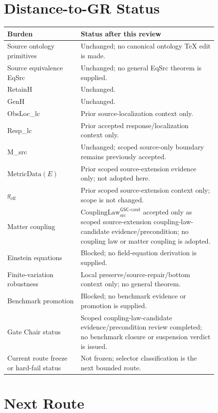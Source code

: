 \documentclass[11pt]{article}
\newcommand{\geff}{g_{\mathrm{eff}}}
\newcommand{\CouplingLaw}{\mathrm{CouplingLaw}^{\mathsf{GSC}\mbox{-}\mathrm{cand}}_{\mathrm{src}}}
\newcommand{\MetricData}{\mathrm{MetricData}}
\begin{document}
\section{Distance-to-GR Status}

\begin{longtable}{p{0.30\linewidth}p{0.56\linewidth}}
\toprule
Burden & Status after this review \\
\midrule
Source ontology primitives & Unchanged; no canonical ontology TeX edit is made. \\
Source equivalence EqSrc & Unchanged; no general EqSrc theorem is supplied. \\
RetainH & Unchanged. \\
GenH & Unchanged. \\
ObsLoc\_lc & Prior source-localization context only. \\
Resp\_lc & Prior accepted response/localization context only. \\
M\_src & Unchanged; scoped source-only boundary remains previously accepted. \\
\(\MetricData(E)\) & Prior scoped source-extension evidence only; not adopted here. \\
\(\geff\) & Prior scoped source-extension context only; scope is not changed. \\
Matter coupling & \(\CouplingLaw\) accepted only as scoped source-extension coupling-law-candidate evidence/precondition; no coupling law or matter coupling is adopted. \\
Einstein equations & Blocked; no field-equation derivation is supplied. \\
Finite-variation robustness & Local preserve/source-repair/bottom context only; no general theorem. \\
Benchmark promotion & Blocked; no benchmark evidence or promotion is supplied. \\
Gate Chair status & Scoped coupling-law-candidate evidence/precondition review completed; no benchmark closure or suspension verdict is issued. \\
Current route freeze or hard-fail status & Not frozen; selector classification is the next bounded route. \\
\bottomrule
\end{longtable}

\section{Next Route}
\end{document}
